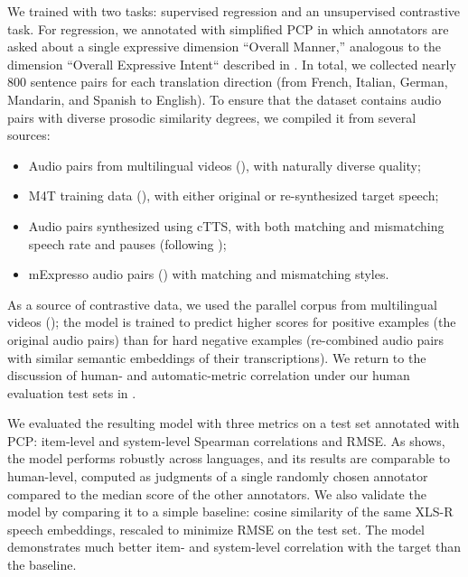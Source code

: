 We trained \comparator with two tasks: supervised regression and an unsupervised contrastive task. For regression, we annotated with simplified PCP in which annotators are asked about a single expressive dimension ``Overall Manner,'' analogous to the dimension ``Overall Expressive Intent`` described in . In total, we collected nearly 800 sentence pairs for each translation direction (from French, Italian, German, Mandarin, and Spanish to English). %
To ensure that the dataset contains audio pairs with diverse prosodic similarity degrees, we compiled it from several sources:
\begin{itemize}[noitemsep,nolistsep]
    \item Audio pairs from multilingual videos (), with naturally diverse quality;
    \item M4T training data (), with either original or re-synthesized target speech;
    \item Audio pairs synthesized using cTTS, with both matching and mismatching speech rate and pauses (following );
    \item mExpresso audio pairs () with matching and mismatching styles.
\end{itemize}

As a source of contrastive data, we used the parallel corpus from multilingual videos (); the model is trained to predict higher scores for positive examples (the original audio pairs) than for hard negative examples (re-combined audio pairs with similar semantic embeddings of their transcriptions). 
We return to the discussion of human- and automatic-metric correlation under our human evaluation test sets in .

We evaluated the resulting model with three metrics on a test set annotated with PCP: item-level and system-level Spearman correlations and RMSE. As  shows, the model performs robustly across languages, and its results are comparable to human-level, computed as judgments of a single randomly chosen annotator compared to the median score of the other annotators. We also validate the model by comparing it to a simple baseline: cosine similarity of the same XLS-R speech embeddings, rescaled to minimize RMSE on the test set. The \comparator model demonstrates much better item- and system-level correlation with the target than the baseline.

